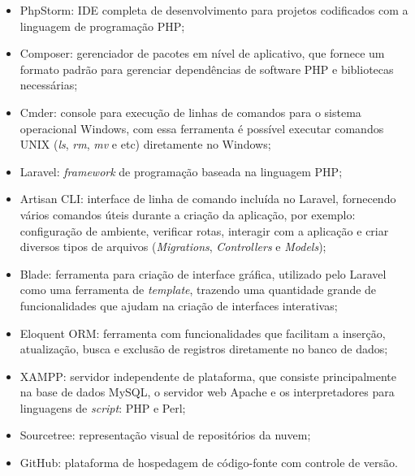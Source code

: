 \begin{itemize}
    \item PhpStorm: IDE completa de desenvolvimento para projetos codificados com a linguagem de programação PHP;
    \item Composer: gerenciador de pacotes em nível de aplicativo, que fornece um formato padrão para gerenciar dependências de software PHP e bibliotecas necessárias;
    \item Cmder: console para execução de linhas de comandos para o sistema operacional Windows, com essa ferramenta é possível executar comandos UNIX (\textit{ls}, \textit{rm}, \textit{mv} e etc) diretamente no Windows;
    \item Laravel: \textit{framework} de programação baseada na linguagem PHP;
    \item Artisan CLI: interface de linha de comando incluída no Laravel, fornecendo vários comandos úteis durante a criação da aplicação, por exemplo: configuração de ambiente, verificar rotas, interagir com a aplicação e criar diversos tipos de arquivos (\textit{Migrations}, \textit{Controllers} e \textit{Models});
    \item Blade: ferramenta para criação de interface gráfica, utilizado pelo Laravel como uma ferramenta de \textit{template}, trazendo uma quantidade grande de funcionalidades que ajudam na criação de interfaces interativas;
    \item Eloquent ORM: ferramenta com funcionalidades que facilitam a inserção, atualização, busca e exclusão de registros diretamente no banco de dados;
    \item XAMPP: servidor independente de plataforma, que consiste principalmente na base de dados MySQL, o servidor web Apache e os interpretadores para linguagens de \textit{script}: PHP e Perl; 
    \item Sourcetree: representação visual de repositórios da nuvem;
    \item GitHub: plataforma de hospedagem de código-fonte com controle de versão.
\end{itemize}

